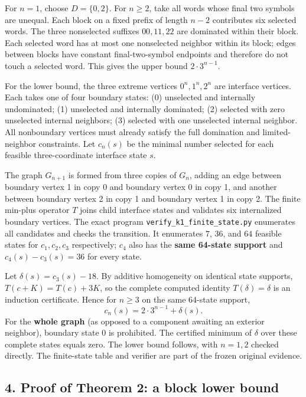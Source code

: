 \documentclass[
  11pt,
]{article}
\begin{document}
For \(n=1\), choose \(D=\{0,2\}\). For \(n\ge2\), take all words whose
final two symbols are unequal. Each block on a fixed prefix of length
\(n-2\) contributes six selected words. The three nonselected suffixes
\(00,11,22\) are dominated within their block. Each selected word has at
most one nonselected neighbor within its block; edges between blocks
have constant final-two-symbol endpoints and therefore do not touch a
selected word. This gives the upper bound \(2\cdot3^{n-1}\).

For the lower bound, the three extreme vertices \(0^n,1^n,2^n\) are
interface vertices. Each takes one of four boundary states: (0)
unselected and internally undominated; (1) unselected and internally
dominated; (2) selected with zero unselected internal neighbors; (3)
selected with one unselected internal neighbor. All nonboundary vertices
must already satisfy the full domination and limited-neighbor
constraints. Let \(c_n(s)\) be the minimal number selected for each
feasible three-coordinate interface state \(s\).

The graph \(G_{n+1}\) is formed from three copies of \(G_n\), adding an
edge between boundary vertex 1 in copy 0 and boundary vertex 0 in copy
1, and another between boundary vertex 2 in copy 1 and boundary vertex 1
in copy 2. The finite min-plus operator \(T\) joins child interface
states and validates six internalized boundary vertices. The exact
program \texttt{verify\_k1\_finite\_state.py} enumerates all candidates
and checks the transition. It enumerates \(7\), \(36\), and \(64\)
feasible states for \(c_1,c_2,c_3\) respectively; \(c_4\) also has the
\textbf{same 64-state support} and \(c_4(s)-c_3(s)=36\) for every state.

Let \(\delta(s)=c_3(s)-18\). By additive homogeneity on identical state
supports, \(T(c+K)=T(c)+3K\), so the complete computed identity
\(T(\delta)=\delta\) is an induction certificate. Hence for \(n\ge3\) on
the same 64-state support, \[c_n(s)=2\cdot3^{n-1}+\delta(s).\] For the
\textbf{whole graph} (as opposed to a component awaiting an exterior
neighbor), boundary state 0 is prohibited. The certified minimum of
\(\delta\) over these complete states equals zero. The lower bound
follows, with \(n=1,2\) checked directly. The finite-state table and
verifier are part of the frozen original evidence.

\subsection{4. Proof of Theorem 2: a block lower
bound}\label{proof-of-theorem-2-a-block-lower-bound}
\end{document}
